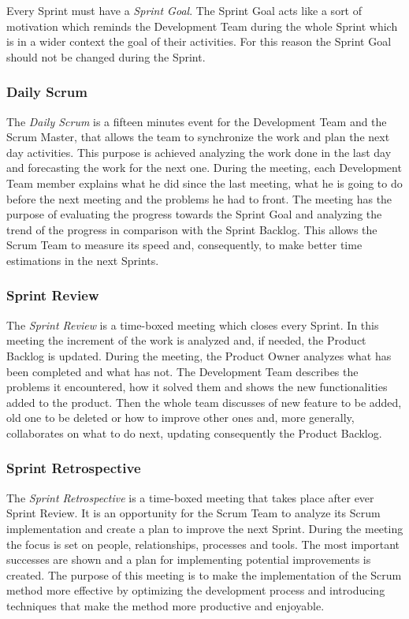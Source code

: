 			Every Sprint must have a \emph{Sprint Goal}. The Sprint Goal acts like a sort of motivation which reminds the Development Team during the whole Sprint which is in a wider context the goal of their activities. For this reason the Sprint Goal should not be changed during the Sprint.
		
			\subsubsection{Daily Scrum}\label{ref_scrum_daily}
			The \emph{Daily Scrum} is a fifteen minutes event for the Development Team and the Scrum Master, that allows the team to synchronize the work and plan the next day activities. This purpose is achieved analyzing the work done in the last day and forecasting the work for the next one. 
			During the meeting, each Development Team member explains what he did since the last meeting, what he is going to do before the next meeting and the problems he had to front.
			The meeting has the purpose of evaluating the progress towards the Sprint Goal and analyzing the trend of the progress in comparison with the Sprint Backlog. This allows the Scrum Team to measure its speed and, consequently, to make better time estimations in the next Sprints. 

			\subsubsection{Sprint Review}\label{ref_scrum_sprint_rev}
			The \emph{Sprint Review} is a time-boxed meeting which closes every Sprint. In this meeting the increment of the work is analyzed and, if needed, the Product Backlog is updated. 
			During the meeting, the Product Owner analyzes what has been completed and what has not. The Development Team describes the problems it encountered, how it solved them and shows the new functionalities added to the product. Then the whole team discusses of new feature to be added, old one to be deleted or how to improve other ones and, more generally, collaborates on what to do next, updating consequently the Product Backlog.			

			\subsubsection{Sprint Retrospective}\label{ref_scrum_sprint_retro}
			The \emph{Sprint Retrospective} is a time-boxed meeting that takes place after ever Sprint Review. It is an opportunity for the Scrum Team to analyze its Scrum implementation and create a plan to improve the next Sprint. 
			During the meeting the focus is set on people, relationships, processes and tools. The most important successes are shown and a plan for implementing potential improvements is created. 
			The purpose of this meeting is to make the implementation of the Scrum method more effective by optimizing the development process and introducing techniques that make the method more productive and enjoyable. 

